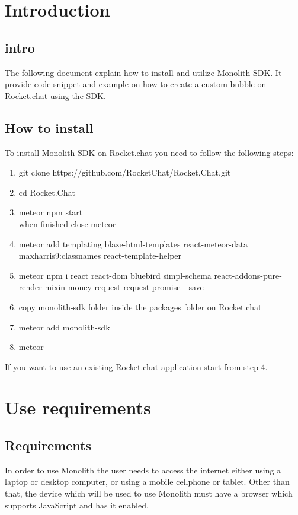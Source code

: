 \section{Introduction}
\subsection{intro}
The following document explain how to install and utilize Monolith SDK.
It provide code snippet and example on how to create a custom bubble on Rocket.chat using the SDK.

\subsection{How to install}
To install Monolith SDK on Rocket.chat you need to follow the following steps:
\begin{enumerate}
    \item git clone https://github.com/RocketChat/Rocket.Chat.git
    \item cd Rocket.Chat
    \item meteor npm start \\ when finished close meteor
    \item meteor add templating blaze-html-templates react-meteor-data maxharris9:classnames react-template-helper
    \item meteor npm i react react-dom bluebird simpl-schema react-addons-pure-render-mixin money request request-promise  -{}-save
    \item copy monolith-sdk folder inside the packages folder on Rocket.chat
    \item meteor add monolith-sdk
    \item meteor
\end{enumerate}

\begin{flushleft}
If you want to use an existing Rocket.chat application start from step 4.
\end{flushleft}

\section{Use requirements}

\subsection{Requirements}
In order to use Monolith the user needs to access the internet either using a laptop or desktop computer, or using a mobile cellphone or tablet. Other than that, the device which will be used to use Monolith must have a browser which supports JavaScript and has it enabled.

